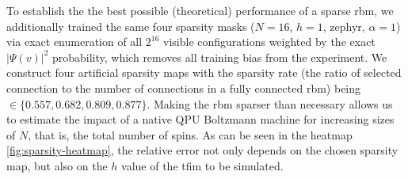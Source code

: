 \documentclass[10pt,a4paper]{article}
\numberwithin{equation}{section}
\begin{document}
To establish the the best possible (theoretical) performance of a sparse \gls{rbm}, we additionally trained the same four sparsity masks ($N=16$, $h=1$, zephyr, $\alpha=1$) via exact enumeration of all $2^{16}$ visible configurations weighted by the exact $|\Psi(v)|^2$ probability, which removes all training bias from the experiment. We construct four artificial sparsity maps with the sparsity rate (the ratio of selected connection to the number of connections in a fully connected \gls{rbm}) being  $\in\{0.557, 0.682, 0.809, 0.877\}$. Making the \gls{rbm} sparser than necessary allows us to estimate the impact of a native QPU Boltzmann machine for increasing sizes of $N$, that is, the total number of spins. As can be seen in the heatmap \autoref{fig:sparsity-heatmap}, the relative error not only depends on the chosen sparsity map, but also on the $h$ value of the \gls{tfim} to be simulated. 
\end{document}
